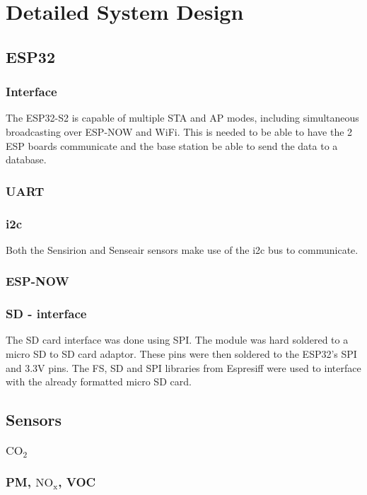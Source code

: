 \chapter{Detailed System Design}
\section{ESP32}

\subsection{Interface}
The ESP32-S2 is capable of multiple STA and AP modes, including simultaneous broadcasting over ESP-NOW and WiFi. This is needed to be able to have the 2 ESP boards communicate and the base station be able to send the data to a database.

\subsection{UART}

\subsection{i2c}
Both the Sensirion and Senseair sensors make use of the i2c bus to communicate. 
\subsection{ESP-NOW}

\subsection{SD - interface}
The SD card interface was done using SPI. The module was hard soldered to a micro SD to SD card adaptor. These pins were then soldered to the ESP32's SPI and 3.3V pins.
The FS, SD and SPI libraries from Espresiff were used to interface with the already formatted micro SD card.




\section{Sensors}
\subsection{$\mathrm{CO_2}$}




\subsection{PM, $\mathrm{NO_x}$, VOC}
